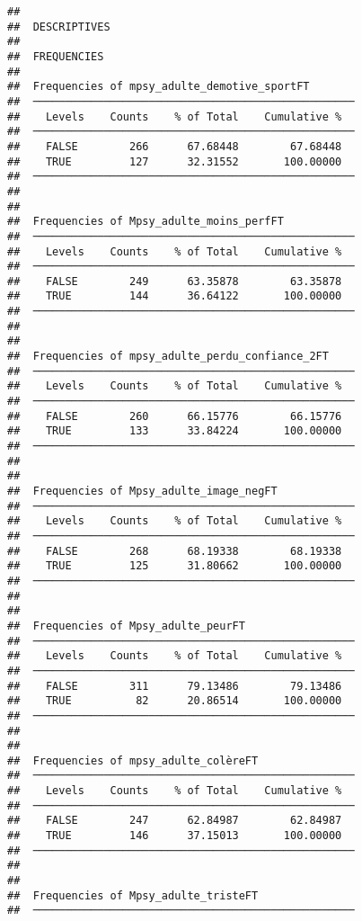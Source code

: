 \documentclass[
]{article}
\begin{document}
\begin{verbatim}
## 
##  DESCRIPTIVES
## 
##  FREQUENCIES
## 
##  Frequencies of mpsy_adulte_demotive_sportFT        
##  ────────────────────────────────────────────────── 
##    Levels    Counts    % of Total    Cumulative %   
##  ────────────────────────────────────────────────── 
##    FALSE        266      67.68448        67.68448   
##    TRUE         127      32.31552       100.00000   
##  ────────────────────────────────────────────────── 
## 
## 
##  Frequencies of Mpsy_adulte_moins_perfFT            
##  ────────────────────────────────────────────────── 
##    Levels    Counts    % of Total    Cumulative %   
##  ────────────────────────────────────────────────── 
##    FALSE        249      63.35878        63.35878   
##    TRUE         144      36.64122       100.00000   
##  ────────────────────────────────────────────────── 
## 
## 
##  Frequencies of mpsy_adulte_perdu_confiance_2FT     
##  ────────────────────────────────────────────────── 
##    Levels    Counts    % of Total    Cumulative %   
##  ────────────────────────────────────────────────── 
##    FALSE        260      66.15776        66.15776   
##    TRUE         133      33.84224       100.00000   
##  ────────────────────────────────────────────────── 
## 
## 
##  Frequencies of Mpsy_adulte_image_negFT             
##  ────────────────────────────────────────────────── 
##    Levels    Counts    % of Total    Cumulative %   
##  ────────────────────────────────────────────────── 
##    FALSE        268      68.19338        68.19338   
##    TRUE         125      31.80662       100.00000   
##  ────────────────────────────────────────────────── 
## 
## 
##  Frequencies of Mpsy_adulte_peurFT                  
##  ────────────────────────────────────────────────── 
##    Levels    Counts    % of Total    Cumulative %   
##  ────────────────────────────────────────────────── 
##    FALSE        311      79.13486        79.13486   
##    TRUE          82      20.86514       100.00000   
##  ────────────────────────────────────────────────── 
## 
## 
##  Frequencies of mpsy_adulte_colèreFT                
##  ────────────────────────────────────────────────── 
##    Levels    Counts    % of Total    Cumulative %   
##  ────────────────────────────────────────────────── 
##    FALSE        247      62.84987        62.84987   
##    TRUE         146      37.15013       100.00000   
##  ────────────────────────────────────────────────── 
## 
## 
##  Frequencies of Mpsy_adulte_tristeFT                
##  ────────────────────────────────────────────────── 

\end{verbatim}
\end{document}
